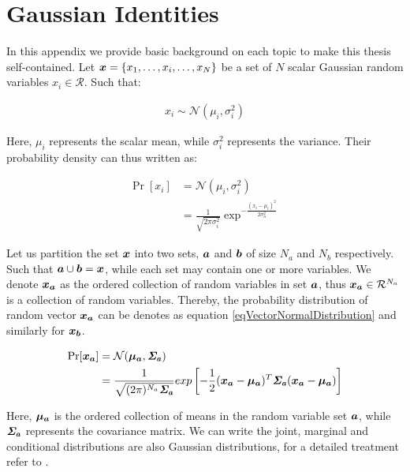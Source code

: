 \chapter{Gaussian Identities}\label{appMathematicalIdentities}

In this appendix we provide basic background on each topic to make this
thesis self-contained. Let $\boldsymbol{x} = \{x_1, \ldots, x_i, \ldots, x_N\}$ be a set of $N$ scalar Gaussian random variables $x_i \in \mathcal{R}$. Such that: 

\begin{align}
x_i \sim \mathcal{N}(\mu_i, \sigma_i^2)
\end{align}

Here, $\mu_i$ represents the scalar mean, while $\sigma_i^2$ represents the variance. Their probability density can thus written as:

\begin{align}
    \Pr[x_i] & = \mathcal{N}(\mu_i, \sigma_i^2) \\
            & = \frac{1}{\sqrt{2\pi\sigma_{i}^{2}}}\exp^{-\frac{(x_i - \mu_i)^{2}}{2\sigma_{n}^{2}}}
\end{align}


Let us partition the set $\boldsymbol{x}$ into two sets, $\boldsymbol{a}$ and $\boldsymbol{b}$ of size $N_a$ and $N_b$ respectively. Such that $\boldsymbol{a} \cup \boldsymbol{b} = \boldsymbol{x}$, while each set may contain one or more variables. We denote $\boldsymbol{x_a}$ as the ordered collection of random variables in set $\boldsymbol{a}$, thus $\boldsymbol{x_a} \in \mathcal{R}^{N_a}$ is a collection of random variables. Thereby, the probability distribution of random vector $\boldsymbol{x_a}$ can be denotes as equation \ref{eqVectorNormalDistribution} and similarly for $\boldsymbol{x_b}$.


\begin{align}\label{eqVectorNormalDistribution}
    \Pr[\boldsymbol{x_a}] & = \mathcal{N}(\boldsymbol{\mu_a}, \bm{\mathit{\Sigma_a}}) \\
            & = \frac{1}{\sqrt{(2\pi)^{N_a} \bm{\mathit{\Sigma_a}}}} exp \left [-\frac{1}{2}(\boldsymbol{x_a} - \boldsymbol{\mu_a})^{T}\bm{\mathit{\Sigma_a}}(\boldsymbol{x_a} - \boldsymbol{\mu_a}) \right ]
\end{align}

Here, $\boldsymbol{\mu_a}$ is the ordered collection of means in the random variable set $\boldsymbol{a}$, while $\bm{\mathit{\Sigma_a}}$ represents the covariance matrix. We can write the joint, marginal and conditional distributions are also Gaussian distributions, for a detailed treatment refer to \cite{bishop2006pattern}.

